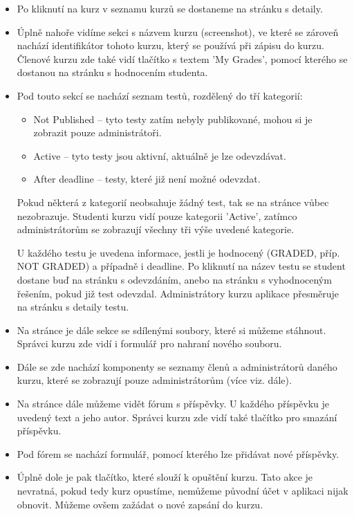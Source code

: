 \begin{itemize}
	\item Po kliknutí na kurz v seznamu kurzů se dostaneme na stránku s detaily.
	\item Úplně nahoře vidíme sekci s názvem kurzu (screenshot), ve které se zároveň nachází identifikátor tohoto kurzu, který se používá při zápisu do kurzu. Členové kurzu zde také vidí tlačítko s textem 'My Grades', pomocí kterého se dostanou na stránku s hodnocením studenta.
	\item Pod touto sekcí se nachází seznam testů, rozdělený do tří kategorií:
		\begin{itemize}
			\item Not Published -- tyto testy zatím nebyly publikované, mohou si je zobrazit pouze administrátoři.
			\item Active -- tyto testy jsou aktivní, aktuálně je lze odevzdávat.
			\item After deadline -- testy, které již není možné odevzdat.
		\end{itemize}
		Pokud některá z kategorií neobsahuje žádný test, tak se na stránce vůbec nezobrazuje. Studenti kurzu vidí pouze kategorii 'Active', zatímco administrátorům se zobrazují všechny tři výše uvedené kategorie.
		
		U každého testu je uvedena informace, jestli je hodnocený (GRADED, příp. NOT GRADED) a případně i deadline.
		Po kliknutí na název testu se student dostane buď na stránku s odevzdáním, anebo na stránku s vyhodnoceným řešením, pokud již test odevzdal. Administrátory kurzu aplikace přesměruje na stránku s detaily testu.
		
	\item Na stránce je dále sekce se sdílenými soubory, které si můžeme stáhnout. Správci kurzu zde vidí i formulář pro nahraní nového souboru.
	\item Dále se zde nachází komponenty se seznamy členů a administrátorů daného kurzu, které se zobrazují pouze administrátorům (více viz. dále).
	\item Na stránce dále můžeme vidět fórum s příspěvky. U každého příspěvku je uvedený text a jeho autor. Správci kurzu zde vidí také tlačítko pro smazání příspěvku.
	\item Pod fórem se nachází formulář, pomocí kterého lze přidávat nové příspěvky.
	\item Úplně dole je pak tlačítko, které slouží k opuštění kurzu. Tato akce je nevratná, pokud tedy kurz opustíme, nemůžeme původní účet v aplikaci nijak obnovit. Můžeme ovšem zažádat o nové zapsání do kurzu.
\end{itemize}

